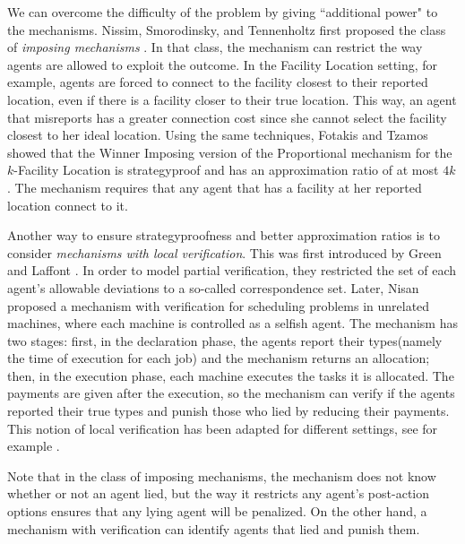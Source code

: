 
We can overcome the difficulty of the problem by giving ``additional power" to the mechanisms. Nissim, Smorodinsky, and Tennenholtz first proposed the class of \emph{imposing mechanisms} \cite{Nissim2010}. In that class, the mechanism can restrict the way agents are allowed to exploit the outcome. In the Facility Location setting, for example, agents are forced to connect to the facility closest to their reported location, even if there is a facility closer to their true location. This way, an agent that misreports has a greater connection cost since she cannot select the facility closest to her ideal location. Using the same techniques, Fotakis and Tzamos \cite{Fotakis2013} showed that the Winner Imposing version of the Proportional mechanism for the $k$-Facility Location is strategyproof and has an approximation ratio of at most $4k$. The mechanism requires that any agent that has a facility at her reported location connect to it. 

Another way to ensure strategyproofness and better approximation ratios is to consider \emph{mechanisms with local verification}. This was first introduced by Green and Laffont \cite{Green1986}. In order to model partial verification, they restricted the set of each agent’s allowable deviations to a so-called correspondence set. Later, Nisan \cite{Nisan2001} proposed a mechanism with verification for scheduling problems in unrelated machines, where each machine is controlled as a selfish agent. The mechanism has two stages: first, in the declaration phase, the agents report their types(namely the time of execution for each job) and the mechanism returns an allocation; then, in the execution phase, each machine executes the tasks it is allocated. The payments are given after the execution, so the mechanism can verify if the agents reported their true types and punish those who lied by reducing their payments. This notion of local verification has been adapted for different settings, see for example \cite{Auletta2009,Carroll2012,Caragiannis2012,Archer2014,Fotakis2015,Fotakis2016}.


Note that in the class of imposing mechanisms, the mechanism does not know whether or not an agent lied, but the way it restricts any agent's post-action options ensures that any lying agent will be penalized. On the other hand, a mechanism with verification can identify agents that lied and punish them. 



